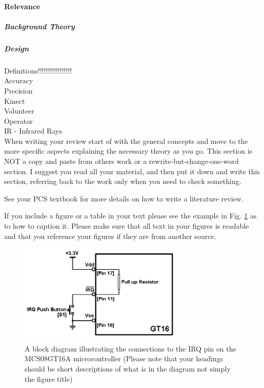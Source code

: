 \paragraph{Relevance}


\subparagraph{Background Theory}

\subparagraph{Design}


Definitions!!!!!!!!!!!!!!!!!\\
Accuracy\\
Precision\\
Kinect\\
Volunteer\\
Operator\\
IR - Infrared Rays\\


When writing your review start of with the general concepts and move to the more specific aspects
explaining the necessary theory as you go. This section is NOT a copy and paste from others work or a
rewrite-but-change-one-word section. I suggest you read all your material, and then put it down and
write this section, referring back to the work only when you need to check something.

See your PCS textbook for more details on how to write a literature review.

If you include a figure or a table in your text please see the example in Fig. \ref{fig:model} as to how to caption it.
Please make sure that all text in your figures is readable and that you reference your figures if they are
from another source.

\begin{figure}[ht]
\centering
\includegraphics[width=0.7\textwidth]{model.png}
\caption{A block diagram illustrating the connections to the IRQ pin on the MCS08GT16A microcontroller (Please
note that your headings should be short descriptions of what is in the diagram not simply the figure title)}
\label{fig:model}
\end{figure}


